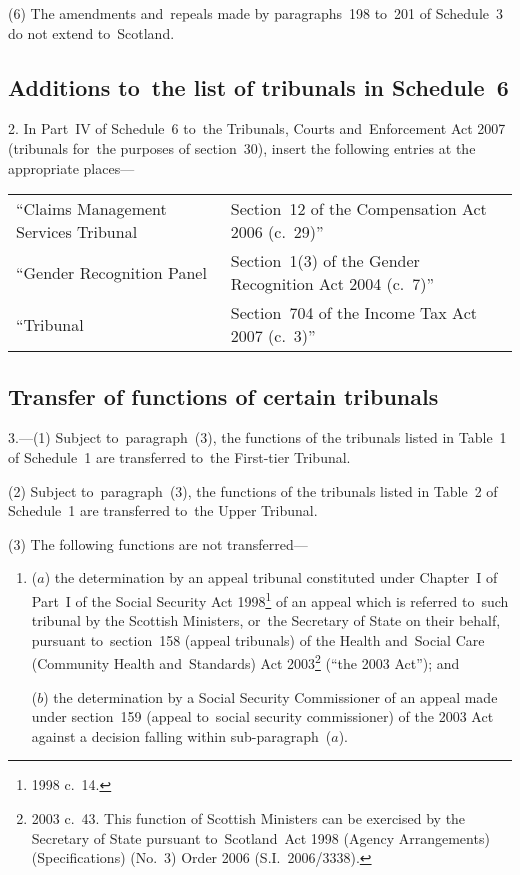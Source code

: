 \documentclass[12pt,a4paper]{article}
\begin{document}
(6) The amendments and~repeals made by paragraphs~198 to~201 of Schedule~3 do not extend to~Scotland.

\subsection[2. Additions to~the list of tribunals in Schedule~6]{Additions to~the list of tribunals in Schedule~6}

2.  In Part~IV of Schedule~6 to~the Tribunals, Courts and~Enforcement Act 2007 (tribunals for~the purposes of section~30), insert the following entries at the appropriate places—

{\footnotesize\noindent
\begin{longtable}{p{150.86967pt}p{215.1561pt}}
\hline
\endhead
\hline
\endlastfoot
“Claims Management Services Tribunal	&Section~12 of the Compensation Act 2006 (c.~29)”\\
“Gender Recognition Panel	&Section~1(3) of the Gender Recognition Act 2004 (c.~7)”\\
“Tribunal	&Section~704 of the Income Tax Act 2007 (c.~3)”\\
\end{longtable}

}

\subsection[3. Transfer of functions of certain tribunals]{Transfer of functions of certain tribunals}

3.---(1)  Subject to~paragraph~(3), the functions of the tribunals listed in Table~1 of Schedule~1 are transferred to~the First-tier Tribunal.

(2) Subject to~paragraph~(3), the functions of the tribunals listed in Table~2 of Schedule~1 are transferred to~the Upper Tribunal.

(3) The following functions are not transferred—
\begin{enumerate}\item[]
($a$) the determination by an appeal tribunal constituted under Chapter~I of Part~I of the Social Security Act 1998\footnote{1998 c.~14.} of an appeal which is referred to~such tribunal by the Scottish Ministers, or~the Secretary of State on their behalf, pursuant to~section~158 (appeal tribunals) of the Health and~Social Care (Community Health and~Standards) Act 2003\footnote{2003 c.~43. This function of Scottish Ministers can be exercised by the Secretary of State pursuant to~Scotland~Act 1998 (Agency Arrangements) (Specifications) (No.~3) Order 2006 (S.I.~2006/3338).} (“the 2003 Act”); and

($b$) the determination by a Social Security Commissioner of an appeal made under section~159 (appeal to~social security commissioner) of the 2003 Act against a decision falling within sub-paragraph~($a$).
\end{enumerate}
\end{document}
